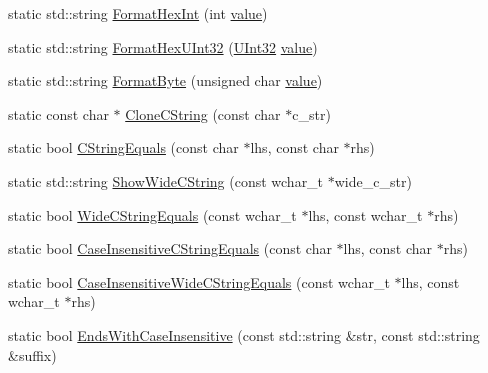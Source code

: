 \begin{DoxyCompactItemize}
\item 
static std\+::string \mbox{\hyperlink{classtesting_1_1internal_1_1_string_affe59102e49092fc0684388e9b0c5c1e}{Format\+Hex\+Int}} (int \mbox{\hyperlink{_obj__test_2lib_2googletest-master_2googlemock_2test_2gmock-matchers__test_8cc_a337b8a670efc0b086ad3af163f3121b6}{value}})
\item 
static std\+::string \mbox{\hyperlink{classtesting_1_1internal_1_1_string_af1c4c9379dfdbf5517d9d554896d0bc5}{Format\+Hex\+U\+Int32}} (\mbox{\hyperlink{namespacetesting_1_1internal_a436defbb8e92c8e94e33ebcc86f278ba}{U\+Int32}} \mbox{\hyperlink{_obj__test_2lib_2googletest-master_2googlemock_2test_2gmock-matchers__test_8cc_a337b8a670efc0b086ad3af163f3121b6}{value}})
\item 
static std\+::string \mbox{\hyperlink{classtesting_1_1internal_1_1_string_af702dc7cbd569589d8e3ff215a7cafa9}{Format\+Byte}} (unsigned char \mbox{\hyperlink{_obj__test_2lib_2googletest-master_2googlemock_2test_2gmock-matchers__test_8cc_a337b8a670efc0b086ad3af163f3121b6}{value}})
\item 
static const char $\ast$ \mbox{\hyperlink{classtesting_1_1internal_1_1_string_a8bce6b1281ae3d2f9061b920aa78aca0}{Clone\+C\+String}} (const char $\ast$c\+\_\+str)
\item 
static bool \mbox{\hyperlink{classtesting_1_1internal_1_1_string_a06919f642bd47f0593196b460d352f24}{C\+String\+Equals}} (const char $\ast$lhs, const char $\ast$rhs)
\item 
static std\+::string \mbox{\hyperlink{classtesting_1_1internal_1_1_string_acbf0511e9ae5009f42de77e565f6ba61}{Show\+Wide\+C\+String}} (const wchar\+\_\+t $\ast$wide\+\_\+c\+\_\+str)
\item 
static bool \mbox{\hyperlink{classtesting_1_1internal_1_1_string_a4f5e053907ebced07fe0dc52dd2d1e85}{Wide\+C\+String\+Equals}} (const wchar\+\_\+t $\ast$lhs, const wchar\+\_\+t $\ast$rhs)
\item 
static bool \mbox{\hyperlink{classtesting_1_1internal_1_1_string_a7ce24c41c67b928fe89434d3571c988c}{Case\+Insensitive\+C\+String\+Equals}} (const char $\ast$lhs, const char $\ast$rhs)
\item 
static bool \mbox{\hyperlink{classtesting_1_1internal_1_1_string_a0a67eac434fa7800640c9d56cb91e105}{Case\+Insensitive\+Wide\+C\+String\+Equals}} (const wchar\+\_\+t $\ast$lhs, const wchar\+\_\+t $\ast$rhs)
\item 
static bool \mbox{\hyperlink{classtesting_1_1internal_1_1_string_a3de1df085eddc89ef3f3833c67aee3fe}{Ends\+With\+Case\+Insensitive}} (const std\+::string \&str, const std\+::string \&suffix)

\end{DoxyCompactItemize}
